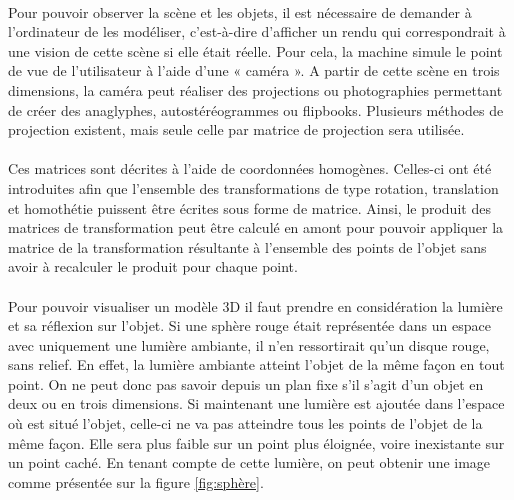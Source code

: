 \paragraph{}
	Pour pouvoir observer la scène et les objets, il est nécessaire de demander à l'ordinateur de les modéliser, c'est-à-dire d'afficher un rendu qui correspondrait à une vision de cette scène si elle était réelle. Pour cela, la machine simule le point de vue de l'utilisateur à l'aide d'une « caméra ». A partir de cette scène en trois dimensions, la caméra peut réaliser des projections ou photographies permettant de créer des anaglyphes, autostéréogrammes ou flipbooks. Plusieurs méthodes de projection existent, mais seule celle par matrice de projection sera utilisée.

\paragraph{}
	Ces matrices sont décrites à l’aide de coordonnées homogènes. Celles-ci ont été introduites afin que l’ensemble des transformations de type rotation, translation et homothétie puissent être écrites sous forme de matrice. Ainsi, le produit des matrices de transformation peut être calculé en amont pour pouvoir appliquer la matrice de la transformation résultante à l’ensemble des points de l’objet sans avoir à recalculer le produit pour chaque point.

\paragraph{}
	Pour pouvoir visualiser un modèle 3D il faut prendre en considération la lumière et sa réflexion sur l’objet. Si une sphère rouge était représentée dans un espace avec uniquement une lumière ambiante, il n’en ressortirait qu’un disque rouge, sans relief. En effet, la lumière ambiante atteint l’objet de la même façon en tout point. On ne peut donc pas savoir depuis un plan fixe s’il s’agit d’un objet en deux ou en trois dimensions. Si maintenant une lumière est ajoutée dans l’espace où est situé l’objet, celle-ci ne va pas atteindre tous les points de l’objet de la même façon. Elle sera plus faible sur un point plus éloignée, voire inexistante sur un point caché. En tenant compte de cette lumière, on peut obtenir une image comme présentée sur la figure \ref{fig:sphère}.

